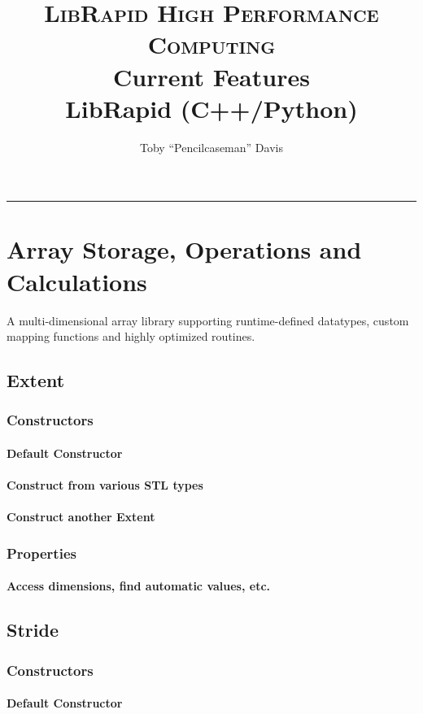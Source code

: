 \documentclass[10pt,a4paper]{report}
\title{
	\textsc{LibRapid High Performance Computing}\\[2.2cm]
	
	
	{\LARGE \bfseries
		Current Features}\\
	{\Large\bfseries
		LibRapid (C++/Python)}
}
\author{Toby ``Pencilcaseman'' Davis}
\date{\monthname\;\the\year}
\begin{document}
	\maketitle
	\thispagestyle{empty}
	\hrule
	\vfill
	\newpage
	\tableofcontents
	\chapter{Array Storage, Operations and Calculations}
	A multi-dimensional array library supporting runtime-defined datatypes, custom mapping functions and highly optimized routines.

	\section{Extent}
		\subsection{Constructors}
			\subsubsection{Default Constructor}
			\subsubsection{Construct from various STL types}
			\subsubsection{Construct another Extent}
		\subsection{Properties}
			\subsubsection{Access dimensions, find automatic values, etc.}

	\section{Stride}
		\subsection{Constructors}
			\subsubsection{Default Constructor}
\end{document}
